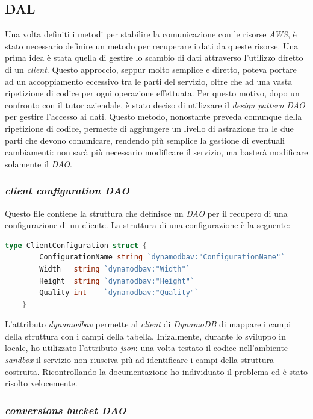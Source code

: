 \subsection{DAL}

Una volta definiti i metodi per stabilire la comunicazione con le risorse
\emph{AWS}, è stato necessario definire un metodo per recuperare i dati da
queste risorse. Una prima idea è stata quella di gestire lo scambio di dati
attraverso l'utilizzo diretto di un \emph{client}. Questo approccio, seppur
molto semplice e diretto, poteva portare ad un accoppiamento eccessivo tra le
parti del servizio, oltre che ad una vasta ripetizione di codice per ogni
operazione effettuata. Per questo motivo, dopo un confronto con il tutor
aziendale, è stato deciso di utilizzare il \emph{design pattern} \emph{DAO} per
gestire l'accesso ai dati. Questo metodo, nonostante preveda comunque della
ripetizione di codice, permette di aggiungere un livello di astrazione tra le
due parti che devono comunicare, rendendo più semplice la gestione di eventuali
cambiamenti: non sarà più necessario modificare il servizio, ma basterà
modificare solamente il \emph{DAO}.

\subsubsection{\emph{client configuration DAO}}

Questo file contiene la struttura che definisce un \emph{DAO} per il recupero di
una configurazione di un cliente. La struttura di una configurazione è la seguente:
\begin{lstlisting}[language=go]
type ClientConfiguration struct {
        ConfigurationName string `dynamodbav:"ConfigurationName"`
        Width   string `dynamodbav:"Width"`
        Height  string `dynamodbav:"Height"`
        Quality int    `dynamodbav:"Quality"`
    }
\end{lstlisting}
L'attributo \emph{dynamodbav} permette al \emph{client} di \emph{DynamoDB} di
mappare i campi della struttura con i campi della tabella. Inizalmente, durante
lo sviluppo in locale, ho utilizzato l'attributo \emph{json}: una volta testato
il codice nell'ambiente \emph{sandbox} il servizio non riusciva più ad
identificare i campi della struttura costruita. Ricontrollando la documentazione
ho individuato il problema ed è stato risolto velocemente.

\subsubsection{\emph{conversions bucket DAO}}

